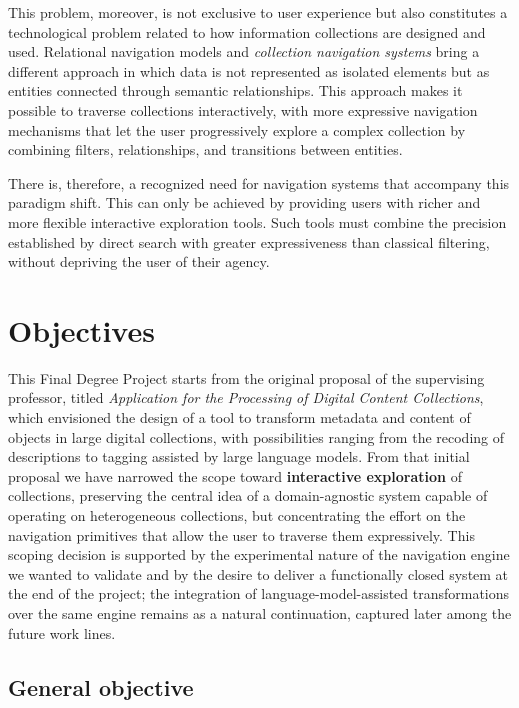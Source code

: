 This problem, moreover, is not exclusive to user experience but also constitutes a
technological problem related to how information collections are designed and used. Relational
navigation models and \textit{collection navigation systems} bring a different approach in
which data is not represented as isolated elements but as entities connected through semantic
relationships. This approach makes it possible to traverse collections interactively, with more
expressive navigation mechanisms that let the user progressively explore a complex collection
by combining filters, relationships, and transitions between entities.

There is, therefore, a recognized need for navigation systems that accompany this paradigm
shift. This can only be achieved by providing users with richer and more flexible interactive
exploration tools. Such tools must combine the precision established by direct search with
greater expressiveness than classical filtering, without depriving the user of their agency.

\section*{Objectives}

This Final Degree Project starts from the original proposal of the supervising professor,
titled \textit{Application for the Processing of Digital Content Collections}, which envisioned
the design of a tool to transform metadata and content of objects in large digital collections,
with possibilities ranging from the recoding of descriptions to tagging assisted by large
language models. From that initial proposal we have narrowed the scope toward \textbf{interactive
exploration} of collections, preserving the central idea of a domain-agnostic system capable of
operating on heterogeneous collections, but concentrating the effort on the navigation
primitives that allow the user to traverse them expressively. This scoping decision is supported
by the experimental nature of the navigation engine we wanted to validate and by the desire to
deliver a functionally closed system at the end of the project; the integration of
language-model-assisted transformations over the same engine remains as a natural continuation,
captured later among the future work lines.

\subsection*{General objective}

